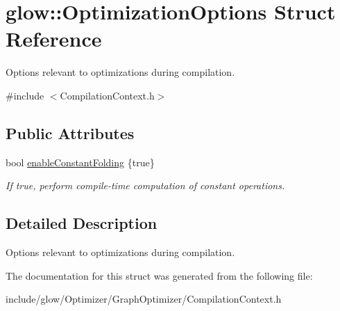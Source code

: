 \hypertarget{structglow_1_1_optimization_options}{}\section{glow\+:\+:Optimization\+Options Struct Reference}
\label{structglow_1_1_optimization_options}


Options relevant to optimizations during compilation.  




{\ttfamily \#include $<$Compilation\+Context.\+h$>$}

\subsection*{Public Attributes}
\begin{DoxyCompactItemize}
\item 
\mbox{\label{structglow_1_1_optimization_options_aa967cb7a0ba10b06a2825adc1b80cbdf}} 
bool \hyperlink{structglow_1_1_optimization_options_aa967cb7a0ba10b06a2825adc1b80cbdf}{enable\+Constant\+Folding} \{true\}
\begin{DoxyCompactList}\small\item\em If true, perform compile-\/time computation of constant operations. \end{DoxyCompactList}\end{DoxyCompactItemize}


\subsection{Detailed Description}
Options relevant to optimizations during compilation. 

The documentation for this struct was generated from the following file\+:\begin{DoxyCompactItemize}
\item 
include/glow/\+Optimizer/\+Graph\+Optimizer/Compilation\+Context.\+h\end{DoxyCompactItemize}
